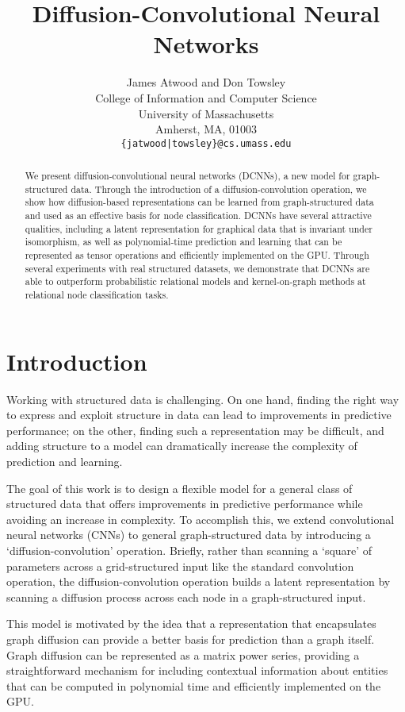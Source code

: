 \documentclass{article}
\author{
  James Atwood and Don Towsley\\
  College of Information and Computer Science\\
  University of Massachusetts\\
  Amherst, MA, 01003 \\
  \texttt{\{jatwood|towsley\}@cs.umass.edu} \\
}
\title{Diffusion-Convolutional Neural Networks}
\begin{document}
\maketitle

\begin{abstract}
  We present diffusion-convolutional neural networks (DCNNs), a new model for graph-structured data.  Through the introduction of a diffusion-convolution operation, we show how diffusion-based representations can be learned from graph-structured data and used as an effective basis for node classification. DCNNs have several attractive qualities, including a latent representation for graphical data that is invariant under isomorphism, as well as polynomial-time prediction and learning that can be represented as tensor operations and efficiently implemented on the GPU.  Through several experiments with real structured datasets, we demonstrate that DCNNs are able to  outperform probabilistic relational models and kernel-on-graph methods at relational node classification tasks.
\end{abstract}

\section{Introduction}

Working with structured data is challenging.  On one hand, finding the right way to express and exploit structure in data can lead to improvements in predictive performance; on the other, finding such a representation may be difficult, and adding structure to a model can dramatically increase the complexity of prediction and learning.

The goal of this work is to design a flexible model for a general class of structured data that offers improvements in predictive performance while avoiding an increase in complexity.  To accomplish this, we extend convolutional neural networks (CNNs) to general graph-structured data by introducing a `diffusion-convolution' operation.  Briefly, rather than scanning a `square' of parameters across a grid-structured input like the standard convolution operation, the diffusion-convolution operation builds a latent representation by scanning a diffusion process across each node in a graph-structured input.

This model is motivated by the idea that a representation that encapsulates graph diffusion can provide a better basis for prediction than a graph itself.  Graph diffusion can be represented as a matrix power series, providing a straightforward mechanism for including contextual information about entities that can be computed in polynomial time and efficiently implemented on the GPU.
\end{document}

